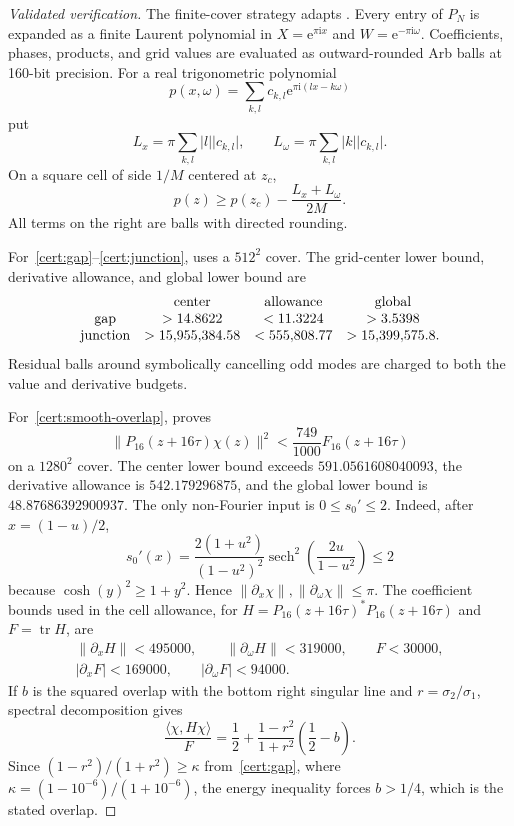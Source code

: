 \documentclass[11pt,reqno]{amsart}
\numberwithin{equation}{section}
\theoremstyle{definition}
\newcommand{\ip}[2]{\langle #1,#2\rangle}
\newcommand{\norm}[1]{\lVert #1\rVert}
\newcommand{\abs}[1]{\lvert #1\rvert}
\newcommand{\e}{\mathrm e}
\newcommand{\ii}{\mathrm i}
\begin{document}
\begin{proof}[Validated verification]
The finite-cover strategy adapts \cite[\S5 and ancillary code]{FPPV2026}.
Every entry of $P_N$ is expanded as a finite Laurent polynomial in
$X=\e^{\pi\ii x}$ and $W=\e^{-\pi\ii\omega}$.  Coefficients, phases, products,
and grid values are evaluated as outward-rounded Arb balls at 160-bit
precision.  For a real trigonometric polynomial
\[
 p(x,\omega)=\sum_{k,l}c_{k,l}\e^{\pi\ii(lx-k\omega)}
\]
put
\begin{equation}\label{eq:fourier-derivative-bounds}
 L_x=\pi\sum_{k,l}|l|\abs{c_{k,l}},\qquad
 L_\omega=\pi\sum_{k,l}|k|\abs{c_{k,l}}.
\end{equation}
On a square cell of side $1/M$ centered at $z_c$,
\begin{equation}\label{eq:cell-cover}
 p(z)\ge p(z_c)-\frac{L_x+L_\omega}{2M}.
\end{equation}
All terms on the right are balls with directed rounding.

For~\ref{cert:gap}--\ref{cert:junction},
 uses a $512^2$ cover.
The grid-center lower bound, derivative allowance, and global lower bound are
\[
\begin{array}{c@{\quad}c@{\quad}c@{\quad}c}
&\text{center}&\text{allowance}&\text{global}\\
\text{gap}&>14.8622&<11.3224&>3.5398\\
\text{junction}&>15{,}955{,}384.58&<555{,}808.77&
>15{,}399{,}575.8.
\end{array}
\]
Residual balls around symbolically cancelling odd modes are charged to both
the value and derivative budgets.

For~\ref{cert:smooth-overlap},
 proves
\[
 \norm{P_{16}(z+16\tau)\chi(z)}^2
 <\frac{749}{1000}F_{16}(z+16\tau)
\]
on a $1280^2$ cover.  The center lower bound exceeds $591.0561608040093$, the
derivative allowance is $542.179296875$, and the global lower bound is
$48.87686392900937$.  The only non-Fourier input is $0\le s_0'\le2$.
Indeed, after $x=(1-u)/2$,
\[
 s_0'(x)=\frac{2(1+u^2)}{(1-u^2)^2}
 \operatorname{sech}^2\!\left(\frac{2u}{1-u^2}\right)\le2
\]
because $\cosh(y)^2\ge1+y^2$.  Hence
$\norm{\partial_x\chi},\norm{\partial_\omega\chi}\le\pi$.  The coefficient
bounds used in the cell allowance, for
$H=P_{16}(z+16\tau)^*P_{16}(z+16\tau)$ and $F=\operatorname{tr}H$, are
\[
\begin{gathered}
 \norm{\partial_x H}<495000,\qquad
 \norm{\partial_\omega H}<319000,\qquad F<30000,\\
 |\partial_x F|<169000,\qquad |\partial_\omega F|<94000.
\end{gathered}
\]
If $b$ is the squared overlap with the bottom right singular line and
$r=\sigma_2/\sigma_1$, spectral decomposition gives
\[
 \frac{\ip{\chi}{H\chi}}{F}
 =\frac12+\frac{1-r^2}{1+r^2}\left(\frac12-b\right).
\]
Since $(1-r^2)/(1+r^2)\ge\kappa$ from~\ref{cert:gap}, where
$\kappa=(1-10^{-6})/(1+10^{-6})$, the energy inequality
forces $b>1/4$, which is the stated overlap.


\end{proof}
\end{document}
